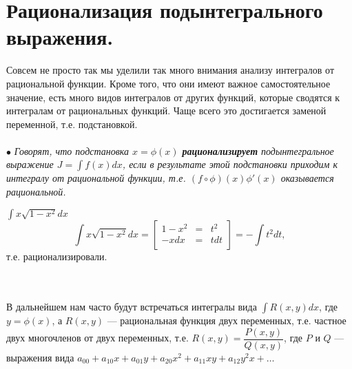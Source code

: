\section{Рационализация подынтегрального выражения.}
Совсем не просто так мы уделили так много внимания анализу интегралов от рациональной функции. Кроме того, что они имеют важное самостоятельное значение, есть много видов интегралов от других функций, которые сводятся к интегралам от рациональных функций. Чаще всего это достигается заменой переменной, т.е. подстановкой.\\\\
$\bullet$ \textit{Говорят, что подстановка $x=\phi(x)$ \textbf{рационализирует} подынтегральное выражение $J=\int f(x)dx$, если в результате этой подстановки приходим к интегралу от рациональной функции, т.е. $(f\circ\phi)(x)\phi'(x)$ оказывается рациональной.}\\
\begin{example} $\int x\sqrt{1-x^2}dx$
	$$\int
	x\sqrt{1-x^2}dx=\left[
	\begin{array}{ccc}
		1-x^2 & = & t^2 \\
		-xdx & = & tdt \\
	\end{array}
	\right]=-\int t^2dt,$$ т.е. рационализировали.
\end{example}\\\\
В дальнейшем нам часто будут встречаться интегралы вида $\int R(x,y)dx$, где $y=\phi(x)$, а $R(x,y)$ --- рациональная функция двух переменных, т.е. частное двух многочленов от двух переменных, т.е. $R(x,y)=\dfrac{P(x,y)}{Q(x,y)}$, где $P$ и $Q$ --- выражения вида $a_{00}+a_{10}x+a_{01}y+a_{20}x^2+a_{11}xy+a_{12}y^2x+\dots$
